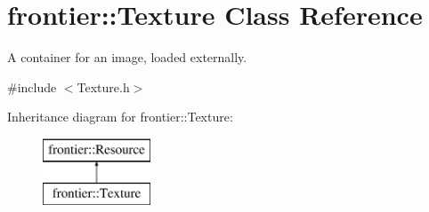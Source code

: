 \hypertarget{classfrontier_1_1_texture}{}\section{frontier\+:\+:Texture Class Reference}
\label{classfrontier_1_1_texture}


A container for an image, loaded externally.  




{\ttfamily \#include $<$Texture.\+h$>$}

Inheritance diagram for frontier\+:\+:Texture\+:\begin{figure}[H]
\begin{center}
\leavevmode
\includegraphics[height=2.000000cm]{classfrontier_1_1_texture}
\end{center}
\end{figure}
